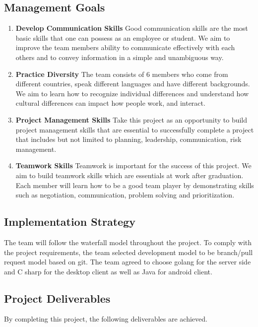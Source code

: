 \documentclass{article}
\begin{document}
\subsection{Management Goals}

\begin{enumerate}
  \item \textbf{Develop Communication Skills} Good communication skills are the most basic skills that one can possess as an employee or student. We aim to improve the team members ability to communicate effectively with each others and  to convey information in a simple and unambiguous way.
  \item \textbf{Practice Diversity} The team consists of 6 members who come from different countries, speak different languages and have different backgrounds. We aim to learn how to recognize individual differences and understand how cultural differences can impact how people work, and interact.
  \item \textbf{Project Management Skills} Take this project as an opportunity to build project management skills that are essential to successfully complete a project that includes but not limited to planning, leadership, communication, risk management.
  \item \textbf{Teamwork Skills} Teamwork is important for the success of this project. We aim to build teamwork skills which are essentials at work after graduation. Each member will learn how to be a good team player by demonstrating skills such as negotiation, communication, problem solving and prioritization.
\end{enumerate}

\subsection{Implementation Strategy}
The team will follow the waterfall model throughout the project. To comply with the project requirements, the team selected development model to be branch/pull request model based on git. The team agreed to choose golang for the server side and C sharp for the desktop client as well as Java for android client.

\subsection{Project Deliverables}
By completing this project, the following deliverables are achieved.
\end{document}
